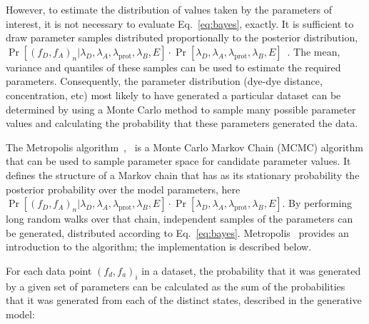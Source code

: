 However, to estimate the distribution of values taken by the parameters of interest, it is not necessary to evaluate Eq.~\ref{eq:bayes}, exactly. It is sufficient to draw parameter samples distributed proportionally to the posterior distribution, $\Pr[(f_D, f_A)_n |\lambda_D, \lambda_A, \lambda_{\text{prot}}, \lambda_B, E] \cdot \Pr[\lambda_D, \lambda_A, \lambda_{\text{prot}}, \lambda_B, E]$~\cite{hastings70}. The mean, variance and quantiles of these samples can be used to estimate the required parameters. Consequently, the parameter distribution (dye-dye distance, concentration, etc) most likely to have generated a particular dataset can be determined by using a Monte Carlo method to sample many possible parameter values and calculating the probability that these parameters generated the data.

The Metropolis algorithm~\cite{metropolis53},~\cite{hastings70} is a Monte Carlo Markov Chain (MCMC) algorithm that can be used to sample parameter space for candidate parameter values. It defines the structure of a Markov chain that has as its stationary probability the posterior probability over the model parameters, here $\Pr[(f_D, f_A)_n |\lambda_D, \lambda_A, \lambda_{\text{prot}}, \lambda_B, E] \cdot \Pr[\lambda_D, \lambda_A, \lambda_{\text{prot}}, \lambda_B, E]$. By performing long random walks over that chain, independent samples of the parameters can be generated, distributed according to Eq.~\ref{eq:bayes}. Metropolis~\cite{chib95} provides an introduction to the algorithm; the implementation is described below.


For each data point $(f_d, f_a)_i$ in a dataset, the probability that it was generated by a given set of parameters can be calculated as the sum of the probabilities that it was generated from each of the distinct states, described in the generative model:

